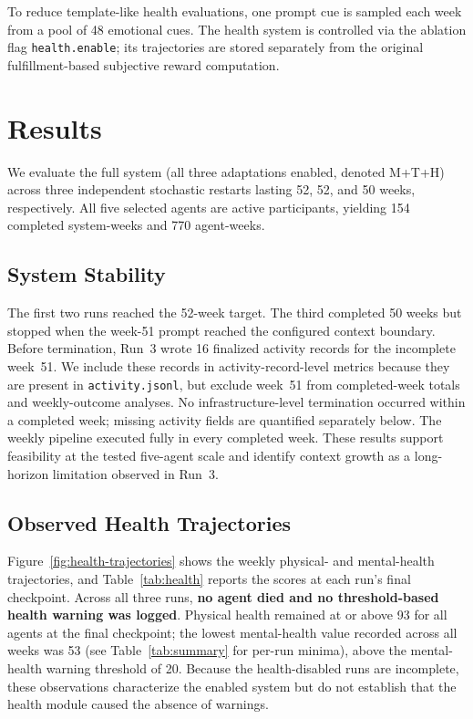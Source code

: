 \documentclass[11pt]{article}
\begin{document}
To reduce template-like health evaluations, one prompt cue is sampled each week from a pool of 48 emotional cues.
The health system is controlled via the ablation flag \texttt{health.enable}; its trajectories are stored separately from the original fulfillment-based subjective reward computation.

\section{Results}

We evaluate the full system (all three adaptations enabled, denoted M+T+H) across three independent stochastic restarts lasting 52, 52, and 50 weeks, respectively.
All five selected agents are active participants, yielding 154 completed system-weeks and 770 agent-weeks.

\subsection{System Stability}

The first two runs reached the 52-week target.
The third completed 50 weeks but stopped when the week-51 prompt reached the configured context boundary.
Before termination, Run~3 wrote 16 finalized activity records for the incomplete week~51.
We include these records in activity-record-level metrics because they are present in \texttt{activity.jsonl}, but exclude week~51 from completed-week totals and weekly-outcome analyses.
No infrastructure-level termination occurred within a completed week; missing activity fields are quantified separately below.
The weekly pipeline executed fully in every completed week.
These results support feasibility at the tested five-agent scale and identify context growth as a long-horizon limitation observed in Run~3.

\subsection{Observed Health Trajectories}

Figure~\ref{fig:health-trajectories} shows the weekly physical- and mental-health trajectories, and Table~\ref{tab:health} reports the scores at each run's final checkpoint.
Across all three runs, \textbf{no agent died and no threshold-based health warning was logged}.
Physical health remained at or above 93 for all agents at the final checkpoint; the lowest mental-health value recorded across all weeks was 53 (see Table~\ref{tab:summary} for per-run minima), above the mental-health warning threshold of 20.
Because the health-disabled runs are incomplete, these observations characterize the enabled system but do not establish that the health module caused the absence of warnings.
\end{document}

